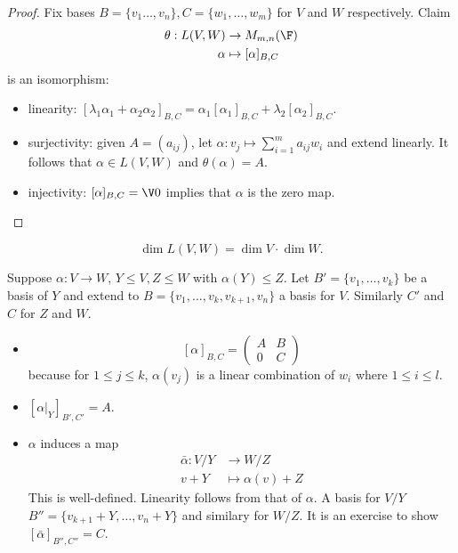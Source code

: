 \documentclass[a4paper]{article}
\theoremstyle{definition}
\begin{document}
\begin{proof}
  Fix bases \(B=\{v_1\ldots,v_n\}, C=\{w_1,\ldots,w_m\}\) for \(V\) and \(W\) respectively. Claim
  \begin{align*}
    \theta: L(V,W) &\to M_{m,n}(\F) \\
    \alpha &\mapsto [\alpha]_{B,C}
  \end{align*}
  is an isomorphism:
  \begin{itemize}
  \item linearity: \([\lambda_1\alpha_1+\alpha_2\alpha_2]_{B,C} = \alpha_1[\alpha_1]_{B,C} + \lambda_2[\alpha_2]_{B,C}\).
  \item surjectivity: given \(A = (a_{ij})\), let \(\alpha:v_j\mapsto \sum_{i=1}^{m}a_{ij}w_i \) and extend linearly. It follows that \(\alpha\in L(V,W)\) and \(\theta(\alpha) = A\).
  \item injectivity: \([\alpha]_{B,C} = \V 0\) implies that \(\alpha\) is the zero map.
  \end{itemize}
\end{proof}

\begin{cor}
  \label{cor:dim of hom}
  \[
\dim L(V,W) = \dim V \cdot \dim W.
  \]
\end{cor}

\begin{eg}
  Suppose \(\alpha:V\to W\), \(Y\leq V, Z\leq W\) with \(\alpha(Y)\leq Z\). Let \(B'=\{v_1,\ldots,v_k\}\) be a basis of \(Y\) and extend to \(B=\{v_1,\ldots,v_k,v_{k+1},v_n\}\) a basis for \(V\). Similarly \(C'\) and \(C\) for \(Z\) and \(W\).
  \begin{itemize}
  \item
    \[
[\alpha]_{B,C} =
\begin{pmatrix}
  A & B \\
  0 & C
\end{pmatrix}
    \]
    because for \(1\leq j \leq k\), \(\alpha(v_j)\) is a linear combination of \(w_i\) where \(1\leq i \leq l\).
  \item \([\alpha|_Y]_{B',C'} = A. \)
  \item \(\alpha\) induces a map
    \begin{align*}
      \bar\alpha: V/Y &\to W/Z \\
      v+ Y &\mapsto \alpha(v) + Z
    \end{align*}
    This is well-defined. Linearity follows from that of \(\alpha\). A basis for \(V/Y\) \(B''=\{v_{k+1}+Y,\ldots,v_n+Y\}\) and similary for \(W/Z\). It is an exercise to show \([\bar\alpha]_{B'',C''} = C \).
  \end{itemize}
\end{eg}
\end{document}
